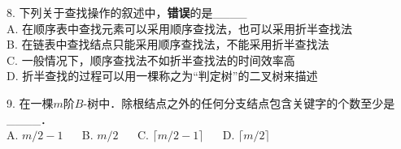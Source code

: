 8. 下列关于查找操作的叙述中，\textbf{错误}的是____ \\
A. 在顺序表中查找元素可以采用顺序查找法，也可以采用折半查找法 \\
B. 在链表中查找结点只能采用顺序查找法，不能采用折半查找法 \\
C. 一般情况下，顺序查找法不如折半查找法的时间效率高 \\
D. 折半查找的过程可以用一棵称之为“判定树”的二叉树来描述

9. 在一棵$m$阶$B$-树中．除根结点之外的任何分支结点包含关键字的个数至少是____． \\
A. $m/2-1$ $\quad$ B. $m/2$ $\quad$ C. $\lceil m/2-1 \rceil $ $\quad$ D. $\lceil m/2 \rceil $